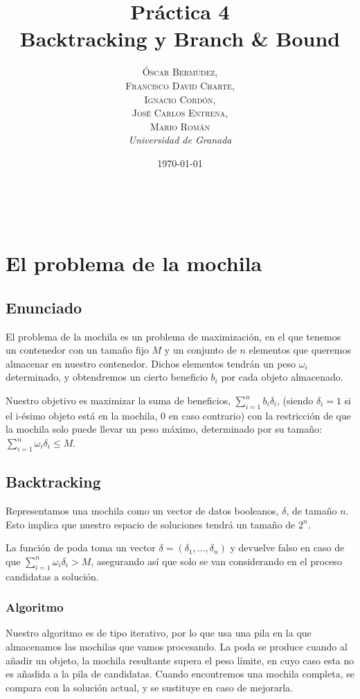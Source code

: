 \documentclass[a4paper, 11pt]{article} %
\title{\textbf{Práctica 4}\\ %
Backtracking y Branch \& Bound} %
\author{\textsc{Óscar Bermúdez,\\Francisco David Charte,\\Ignacio Cordón,\\José Carlos Entrena,\\Mario Román} %
\\{\textit{Universidad de Granada}}} %
\date{\today} %
\makeatletter
\renewcommand{\maketitle}{ %
\begin{flushright} %
{\LARGE\@title} %

\vspace{50pt} %

{\large\@author} %
\\\@date %

\vspace{40pt} %
\end{flushright}
}
\makeatother
\begin{document}
\maketitle %

\renewcommand{\abstractname}{Resumen} %
\begin{abstract}
\end{abstract}
{\parskip=2pt
\tableofcontents
}
\pagebreak


\section{El problema de la mochila}

\subsection{Enunciado}
El problema de la mochila es un problema de maximización, en el que tenemos un contenedor con un tamaño 
fijo $M$ y un conjunto de $n$ elementos que queremos almacenar en nuestro contenedor. Dichos elementos tendrán un peso $\omega_i$
determinado, y obtendremos un cierto beneficio $b_i$ por cada objeto almacenado.

Nuestro objetivo es maximizar la suma de beneficios, $\sum_{i=1}^{n} b_i\delta_i$, (siendo $\delta_i = 1$ si el i-ésimo objeto está en la mochila, 0 en caso contrario) con la restricción de que la mochila solo puede llevar un peso máximo, determinado por su tamaño: $\sum_{i=1}^{n} \omega_i\delta_i \leq M$.

  
    \subsection{Backtracking}
Representamos una mochila como un vector de datos booleanos, $\delta$, de tamaño $n$. Esto implica que nuestro espacio de soluciones tendrá un tamaño de $2^n$.

La función de poda toma un vector $\delta = (\delta_1, \dots, \delta_n)$ y devuelve falso en caso de que $\sum_{i=1}^{n} \omega_i\delta_i > M$, asegurando así que solo se van considerando en el proceso candidatas a solución.

	\newpage

	\subsubsection{Algoritmo}
Nuestro algoritmo es de tipo iterativo, por lo que usa una pila en la que almacenamos las mochilas que vamos procesando. La poda se produce cuando al añadir un objeto, la mochila resultante supera el peso límite, en cuyo caso esta no es añadida a la pila de candidatas. Cuando encontremos una mochila completa, se compara con la solución actual, y se sustituye en caso de mejorarla. 
\end{document}
